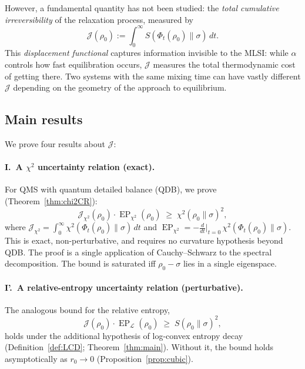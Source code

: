 \documentclass[11pt,a4paper]{article}
\theoremstyle{definition}
\theoremstyle{remark}
\DeclareMathOperator{\EP}{EP}
\newcommand{\LL}{\mathcal{L}}
\newcommand{\ddt}{\tfrac{d}{dt}}
\newcommand{\Jchi}{\mathcal{J}_{\chi^2}}
\newcommand{\EPchi}{\EP_{\chi^2}}
\begin{document}
However, a fundamental quantity has not been studied: the
\emph{total cumulative irreversibility} of the relaxation process,
measured by
\begin{equation}\label{eq:J-intro}
  \mathcal{J}(\rho_0) := \int_0^\infty S(\Phi_t(\rho_0)\|\sigma)\,dt.
\end{equation}
This \emph{displacement functional} captures information invisible
to the MLSI: while $\alpha$ controls how fast equilibration occurs,
$\mathcal{J}$ measures the total thermodynamic cost of getting there.
Two systems with the same mixing time can have vastly different
$\mathcal{J}$ depending on the geometry of the approach to
equilibrium.

\subsection{Main results}

We prove four results about $\mathcal{J}$:

\paragraph{I.\ A $\chi^2$ uncertainty relation (exact).}
For QMS with quantum detailed balance (QDB), we prove
(Theorem~\ref{thm:chi2CR}):
\begin{equation}\label{eq:chi2-intro}
  \boxed{\Jchi(\rho_0) \cdot \EPchi(\rho_0)
  \;\ge\; \chi^2(\rho_0\|\sigma)^2,}
\end{equation}
where
$\Jchi = \int_0^\infty \chi^2(\Phi_t(\rho_0)\|\sigma)\,dt$
and
$\EPchi = -\ddt|_{t=0}\,\chi^2(\Phi_t(\rho_0)\|\sigma)$.
This is exact, non-perturbative, and requires no curvature
hypothesis beyond QDB\@.  The proof is a single application of
Cauchy--Schwarz to the spectral decomposition.  The bound is
saturated iff $\rho_0 - \sigma$ lies in a single eigenspace.

\paragraph{I'.\ A relative-entropy uncertainty relation
(perturbative).}
The analogous bound for the relative entropy,
\begin{equation}\label{eq:main-intro}
  \mathcal{J}(\rho_0) \cdot \EP_\LL(\rho_0)
  \;\ge\; S(\rho_0\|\sigma)^2,
\end{equation}
holds under the additional hypothesis of log-convex entropy decay
(Definition~\ref{def:LCD}; Theorem~\ref{thm:main}).  Without it,
the bound holds asymptotically as $r_0 \to 0$
(Proposition~\ref{prop:cubic}).
\end{document}
